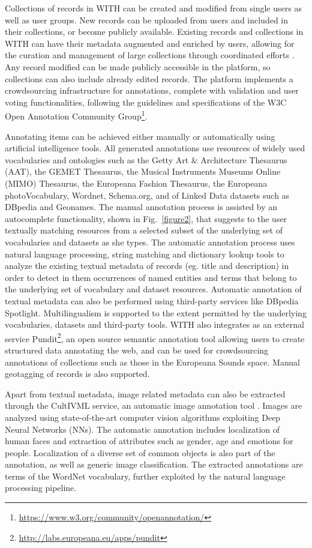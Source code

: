 \documentclass[runningheads,a4paper]{llncs}
\begin{document}
Collections of records in WITH can be created and modified from single users as well as user groups. New records can be uploaded from users and included in their collections, or become publicly available. Existing records and collections in WITH can have their metadata augmented and enriched by users, allowing for the curation and management of large collections through coordinated efforts  \cite{_Ref490496635}. Any record modified can be made publicly accessible in the platform, so collections can also include already edited records. The platform implements a crowdsourcing infrastructure for annotations, complete with validation and user voting functionalities, following the guidelines and specifications of the W3C Open Annotation Community Group\footnote{\url{https://www.w3.org/community/openannotation/}}.

Annotating items can be achieved either manually or automatically using artificial intelligence tools. All generated annotations use resources of widely used vocabularies and ontologies such as the Getty Art \& Architecture Thesaurus (AAT), the GEMET Thesaurus, the Musical Instruments Museums Online (MIMO) Thesaurus, the Europeana Fashion Thesaurus, the Europeana photoVocabulary, Wordnet, Schema.org, and of Linked Data datasets such as DBpedia and Geonames. The manual annotation process is assisted by an autocomplete functionality, shown in Fig.~\ref{figure2}, that suggests to the user textually matching resources from a selected subset of the underlying set of vocabularies and datasets as she types. The automatic annotation process uses natural language processing, string matching and dictionary lookup tools to analyze the existing textual metadata of records (eg. title and description) in order to detect in them occurrences of named entities and terms that belong to the underlying set of vocabulary and dataset resources. Automatic annotation of textual metadata can also be performed using third-party services like DBpedia Spotlight. Multilingualism is supported to the extent permitted by the underlying vocabularies, datasets and third-party tools. WITH also integrates as an external service Pundit\footnote{\url{http://labs.europeana.eu/apps/pundit}}, an open source semantic annotation tool allowing users to create structured data annotating the web, and can be used for crowdsourcing annotations of collections such as those in the Europeana Sounds space. Manual geotagging of records is also supported.

Apart from textual metadata, image related metadata can also be extracted through the CultIVML service, an automatic image annotation tool  \cite{_Ref490496646}. Images are analyzed using state-of-the-art computer vision algorithms exploiting Deep Neural Networks (NNs). The automatic annotation includes localization of human faces and extraction of attributes such as gender, age and emotions for people. Localization of a diverse set of common objects is also part of the annotation, as well as generic image classification. The extracted annotations are terms of the WordNet vocabulary, further exploited by the natural language processing pipeline.
\end{document}
